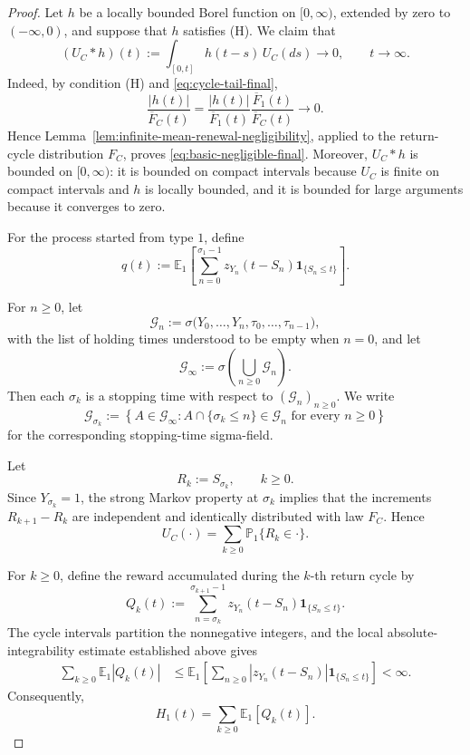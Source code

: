 \documentclass[10pt,a4paper]{amsart}
\newcommand{\E}{\mathbb E}
\newcommand{\Pbb}{\mathbb P}
\newcommand{\ind}[1]{\mathbf 1_{\{#1\}}}
\begin{document}
\begin{proof}
Let \(h\) be a locally bounded Borel function on \([0,\infty)\), extended by zero to \((-\infty,0)\), and suppose that \(h\) satisfies \textup{(H)}. We claim that
\begin{equation}\label{eq:basic-negligible-final}
  (U_C*h)(t):=
  \int_{[0,t]}h(t-s)\,U_C(ds)
  \longrightarrow0,
  \qquad t\to\infty.
\end{equation}
Indeed, by condition \textup{(H)} and \eqref{eq:cycle-tail-final},
\[
  \frac{|h(t)|}{\overline F_C(t)}
  =
  \frac{|h(t)|}{\overline F_1(t)}
  \frac{\overline F_1(t)}{\overline F_C(t)}
  \longrightarrow0.
\]
Hence Lemma~\ref{lem:infinite-mean-renewal-negligibility}, applied to the return-cycle distribution \(F_C\), proves \eqref{eq:basic-negligible-final}. Moreover, \(U_C*h\) is bounded on \([0,\infty)\): it is bounded on compact intervals because \(U_C\) is finite on compact intervals and \(h\) is locally bounded, and it is bounded for large arguments because it converges to zero.

For the process started from type \(1\), define
\begin{equation}\label{eq:cycle-reward-final}
  q(t):=
  \E_1\left[
    \sum_{n=0}^{\sigma_1-1}
    z_{Y_n}(t-S_n)\ind{S_n\le t}
  \right].
\end{equation}



For \(n\ge0\), let
\[
  \mathcal G_n
  :=
  \sigma\bigl(
    Y_0,\ldots,Y_n,
    \tau_0,\ldots,\tau_{n-1}
  \bigr),
\]
with the list of holding times understood to be empty when \(n=0\), and
let
\[
  \mathcal G_\infty
  :=
  \sigma\left(\bigcup_{n\ge0}\mathcal G_n\right).
\]
Then each \(\sigma_k\) is a stopping time with respect to
\((\mathcal G_n)_{n\ge0}\). We write
\[
  \mathcal G_{\sigma_k}
  :=
  \left\{
    A\in\mathcal G_\infty:
    A\cap\{\sigma_k\le n\}\in\mathcal G_n
    \text{ for every }n\ge0
  \right\}
\]
for the corresponding stopping-time sigma-field.

Let
\[
  R_k:=S_{\sigma_k},
  \qquad k\ge0.
\]
Since \(Y_{\sigma_k}=1\), the strong Markov property at \(\sigma_k\)
implies that the increments \(R_{k+1}-R_k\) are independent and
identically distributed with law \(F_C\). Hence
\[
  U_C(\cdot)
  =
  \sum_{k\ge0}\Pbb_1\{R_k\in\cdot\}.
\]

For \(k\ge0\), define the reward accumulated during the \(k\)-th return
cycle by
\[
  Q_k(t)
  :=
  \sum_{n=\sigma_k}^{\sigma_{k+1}-1}
  z_{Y_n}(t-S_n)\ind{S_n\le t}.
\]
The cycle intervals partition the nonnegative integers, and the local
absolute-integrability estimate established above gives
\[
\begin{split}
  \sum_{k\ge0}\E_1|Q_k(t)|
  &\le
  \E_1\left[
    \sum_{n\ge0}
    |z_{Y_n}(t-S_n)|\ind{S_n\le t}
  \right]
  <\infty.
\end{split}
\]
Consequently,
\[
  H_1(t)=\sum_{k\ge0}\E_1[Q_k(t)].
\]


\end{proof}
\end{document}
